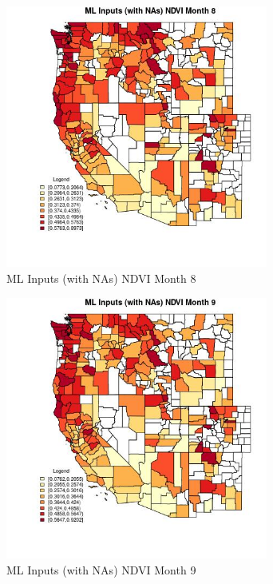\begin{figure} 
\centering  
\includegraphics[width=0.77\textwidth]{Code_Outputs/Report_ML_input_PM25_Step4_part_f_de_duplicated_aves_prioritize_24hr_obswNAs_CountyNDVImedianMonth8.jpg} 
\caption{\label{fig:Report_ML_input_PM25_Step4_part_f_de_duplicated_aves_prioritize_24hr_obswNAsCountyNDVImedianMonth8}ML Inputs (with NAs) NDVI Month 8} 
\end{figure} 
 

\begin{figure} 
\centering  
\includegraphics[width=0.77\textwidth]{Code_Outputs/Report_ML_input_PM25_Step4_part_f_de_duplicated_aves_prioritize_24hr_obswNAs_CountyNDVImedianMonth9.jpg} 
\caption{\label{fig:Report_ML_input_PM25_Step4_part_f_de_duplicated_aves_prioritize_24hr_obswNAsCountyNDVImedianMonth9}ML Inputs (with NAs) NDVI Month 9} 
\end{figure} 
 

